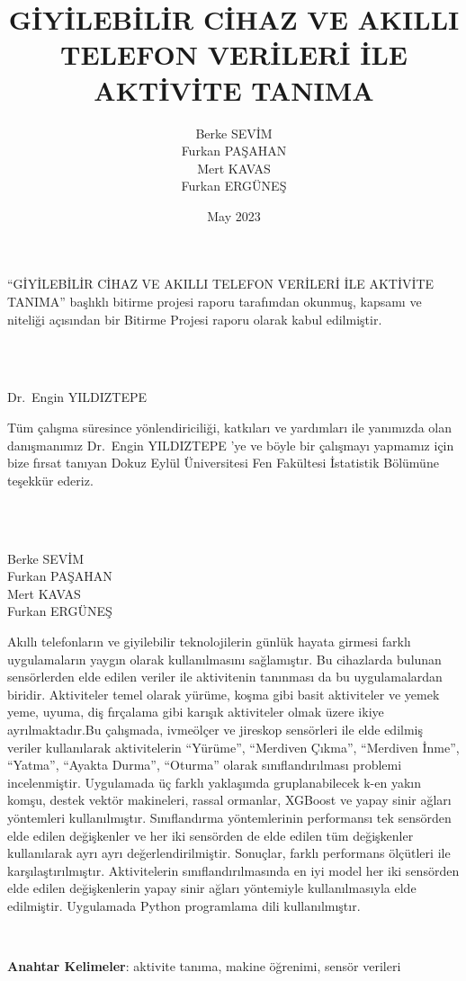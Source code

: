 \documentclass[12pt,twoside]{deuthesis}
\title{GİYİLEBİLİR CİHAZ VE AKILLI TELEFON VERİLERİ İLE AKTİVİTE TANIMA}
\author{Berke SEVİM \\ Furkan PAŞAHAN \\ Mert KAVAS \\ Furkan ERGÜNEŞ} %
\date{May 2023}
\begin{document}
  \maketitle

\frontmatter %
\pagestyle{empty} %
\begin{preface}
	``GİYİLEBİLİR CİHAZ VE AKILLI TELEFON VERİLERİ İLE AKTİVİTE TANIMA'' başlıklı bitirme projesi raporu tarafımdan okunmuş, kapsamı ve niteliği açısından bir Bitirme Projesi raporu olarak kabul edilmiştir.\\
\strut \\
\strut \\
Dr.~Engin YILDIZTEPE
\end{preface}
  \begin{acknowledgements}
    Tüm çalışma süresince yönlendiriciliği, katkıları ve yardımları ile yanımızda olan danışmanımız Dr.~Engin YILDIZTEPE 'ye ve böyle bir çalışmayı yapmamız için bize fırsat tanıyan Dokuz Eylül Üniversitesi Fen Fakültesi İstatistik Bölümüne teşekkür ederiz.\\
    \strut \\
    \strut \\
    Berke SEVİM\\
    Furkan PAŞAHAN\\
    Mert KAVAS\\
    Furkan ERGÜNEŞ\\
  \end{acknowledgements}
\begin{abstractTR}
	Akıllı telefonların ve giyilebilir teknolojilerin günlük hayata girmesi farklı uygulamaların yaygın olarak kullanılmasını sağlamıştır. Bu cihazlarda bulunan sensörlerden elde edilen veriler ile aktivitenin tanınması da bu uygulamalardan biridir. Aktiviteler temel olarak yürüme, koşma gibi basit aktiviteler ve yemek yeme, uyuma, diş fırçalama gibi karışık aktiviteler olmak üzere ikiye ayrılmaktadır.Bu çalışmada, ivmeölçer ve jireskop sensörleri ile elde edilmiş veriler kullanılarak aktivitelerin ``Yürüme'', ``Merdiven Çıkma'', ``Merdiven İnme'', ``Yatma'', ``Ayakta Durma'', ``Oturma'' olarak sınıflandırılması problemi incelenmiştir. Uygulamada üç farklı yaklaşımda gruplanabilecek k-en yakın komşu, destek vektör makineleri, rassal ormanlar, XGBoost ve yapay sinir ağları yöntemleri kullanılmıştır. Sınıflandırma yöntemlerinin performansı tek sensörden elde edilen değişkenler ve her iki sensörden de elde edilen tüm değişkenler kullanılarak ayrı ayrı değerlendirilmiştir. Sonuçlar, farklı performans ölçütleri ile karşılaştırılmıştır. Aktivitelerin sınıflandırılmasında en iyi model her iki sensörden elde edilen değişkenlerin yapay sinir ağları yöntemiyle kullanılmasıyla elde edilmiştir. Uygulamada Python programlama dili kullanılmıştır.

~

\textbf{Anahtar Kelimeler}: aktivite tanıma, makine öğrenimi, sensör verileri
\end{abstractTR}
\end{document}
